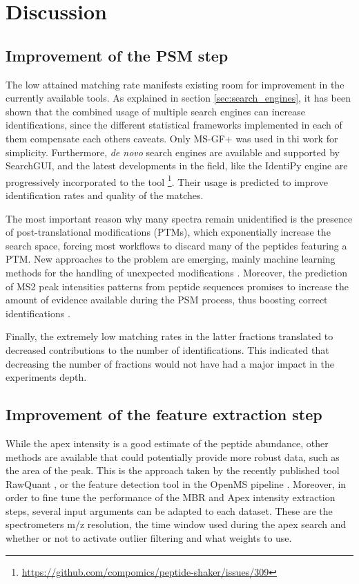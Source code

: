 \section{Discussion}

\subsection{Improvement of the PSM step}

The low attained matching rate manifests existing room for improvement in the currently available tools. As explained in section \ref{sec:search_engines}, it has been shown that the combined usage of multiple search engines can increase identifications, since the different statistical frameworks implemented in each of them compensate each other\textquotesingle s caveats. Only MS-GF+ was used in thi work for simplicity. Furthermore, \textit{de novo} search engines are available and supported by SearchGUI, and the latest developments in the field, like the IdentiPy engine \cite{Levitsky2018} are progressively incorporated to the tool \footnote{\href{https://github.com/compomics/peptide-shaker/issues/309}{https://github.com/compomics/peptide-shaker/issues/309}}. Their usage is predicted to improve identification rates and quality of the matches.

The most important reason why many spectra remain unidentified is the presence of post-translational modifications (\ac{PTM}s), which exponentially increase the search space, forcing most workflows to discard many of the peptides featuring a PTM. New approaches to the problem are emerging, mainly machine learning methods for the handling of unexpected modifications \cite{Gabriels}. Moreover, the prediction of \ac{MS2} peak intensities patterns from peptide sequences promises to increase the amount of evidence available during the PSM process, thus boosting correct identifications \cite{Kirik2018} \cite{Degroeve2013}.

Finally, the extremely low matching rates in the latter fractions translated to decreased contributions to the number of identifications. This indicated that decreasing the number of fractions would not have had a major impact in the experiment\textquotesingle s depth.

\subsection{Improvement of the feature extraction step}

While the apex intensity is a good estimate of the peptide abundance, other methods are available that could potentially provide more robust data, such as the area of the peak. This is the approach taken by the recently published tool RawQuant \cite{Kovalchik2018}, or the feature detection tool in the OpenMS pipeline \cite{Sturm2008}. Moreover, in order to fine tune the performance of the \ac{MBR} and Apex intensity extraction steps, several input arguments can be adapted to each dataset. These are the spectrometer\textquotesingle s \ac{m/z} resolution, the time window used during the apex search and whether or not to activate outlier filtering and what weights to use.

